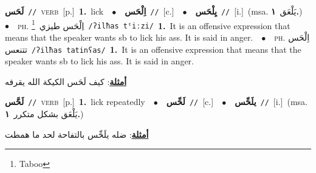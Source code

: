 \documentclass[10pt,a4paper,twoside]{article} %
\begin{document}
\begin{multicols}{2}
{\setlength\topsep{0pt}\textbf{\foreignlanguage{arabic}{لَحَس}}\ {\color{gray}\texttt{//}\color{black}}\ \textsc{verb}\ [p.]\ \textbf{1.}~lick\ \ $\bullet$\ \ \setlength\topsep{0pt}\textbf{\foreignlanguage{arabic}{اِلْحَس}}\ {\color{gray}\texttt{//}\color{black}}\ [c.]\ \ $\bullet$\ \ \setlength\topsep{0pt}\textbf{\foreignlanguage{arabic}{يِلْحَس}}\ {\color{gray}\texttt{//}\color{black}}\ [i.]\ \color{gray}(msa. \foreignlanguage{arabic}{يَلْعَق}~\foreignlanguage{arabic}{\textbf{١.}})\color{black}\ \ $\bullet$\ \ \textsc{ph.} \color{gray} \foreignlanguage{arabic}{اِلْحَس طيزي}\color{black}\ \footnote{Taboo}\ {\color{gray}\texttt{/{\sffamily ʔilħas tˤiːzi}/}\color{black}}\ \textbf{1.}~It is an offensive expression that means that the speaker wants sb to lick his ass. It is said in anger.\ \ $\bullet$\ \ \textsc{ph.} \color{gray} \foreignlanguage{arabic}{اِلْحَس تتنعس}\color{black}\ {\color{gray}\texttt{/{\sffamily ʔilħas tatinʕas}/}\color{black}}\ \textbf{1.}~It is an offensive expression that means that the speaker wants sb to lick his ass. It is said in anger.\  \begin{flushright}\color{gray}\foreignlanguage{arabic}{\textbf{\underline{\foreignlanguage{arabic}{أمثلة}}}: كيف لَحَس الكيكة الله يقرفه}\end{flushright}\color{black}} \vspace{2mm}

{\setlength\topsep{0pt}\textbf{\foreignlanguage{arabic}{لَحَّس}}\ {\color{gray}\texttt{//}\color{black}}\ \textsc{verb}\ [p.]\ \textbf{1.}~lick repeatedly\ \ $\bullet$\ \ \setlength\topsep{0pt}\textbf{\foreignlanguage{arabic}{لَحِّس}}\ {\color{gray}\texttt{//}\color{black}}\ [c.]\ \ $\bullet$\ \ \setlength\topsep{0pt}\textbf{\foreignlanguage{arabic}{يلَحِّس}}\ {\color{gray}\texttt{//}\color{black}}\ [i.]\ \color{gray}(msa. \foreignlanguage{arabic}{يَلْعَق بشكل متكرر}~\foreignlanguage{arabic}{\textbf{١.}})\color{black}\  \begin{flushright}\color{gray}\foreignlanguage{arabic}{\textbf{\underline{\foreignlanguage{arabic}{أمثلة}}}: ضله يلَحِّس بالتفاحة لحد ما همطت}\end{flushright}\color{black}} \vspace{2mm}


\end{multicols}
\end{document}
